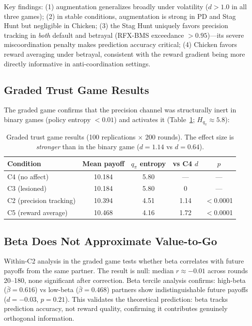 \documentclass[11pt,a4paper]{article}
\begin{document}
Key findings: (1) augmentation generalizes broadly under volatility ($d > 1.0$ in all three games); (2) in stable conditions, augmentation is strong in PD and Stag Hunt but negligible in Chicken; (3) the Stag Hunt uniquely favors precision tracking in \emph{both} default and betrayal (RFX-BMS exceedance $> 0.95$)---its severe miscoordination penalty makes prediction accuracy critical; (4) Chicken favors reward averaging under betrayal, consistent with the reward gradient being more directly informative in anti-coordination settings.

\subsection{Graded Trust Game Results}

The graded game confirms that the precision channel was structurally inert in binary games (policy entropy $< 0.01$) and activates it (Table~\ref{tab:graded}; $H_{q_\pi} \approx 5.8$):

\begin{table}[ht]
\centering\small
\begin{tabular}{lcccc}
\toprule
Condition & Mean payoff & $q_\pi$ entropy & vs C4 $d$ & $p$ \\
\midrule
C4 (no affect) & 10.184 & 5.80 & --- & --- \\
C3 (lesioned) & 10.184 & 5.80 & 0 & --- \\
C2 (precision tracking) & 10.394 & 4.51 & 1.14 & $<$0.0001 \\
C5 (reward average) & 10.468 & 4.16 & 1.72 & $<$0.0001 \\
\bottomrule
\end{tabular}
\caption{Graded trust game results (100 replications $\times$ 200 rounds). The effect size is \emph{stronger} than in the binary game ($d = 1.14$ vs $d = 0.64$).}
\label{tab:graded}
\end{table}

\subsection{Beta Does Not Approximate Value-to-Go}

Within-C2 analysis in the graded game tests whether beta correlates with future payoffs from the same partner. The result is null: median $r \approx -0.01$ across rounds 20--180, none significant after correction. Beta tercile analysis confirms: high-beta ($\bar{\beta} = 0.616$) vs low-beta ($\bar{\beta} = 0.468$) partners show indistinguishable future payoffs ($d = -0.03$, $p = 0.21$). This validates the theoretical prediction: beta tracks prediction accuracy, not reward quality, confirming it contributes genuinely orthogonal information.
\end{document}
